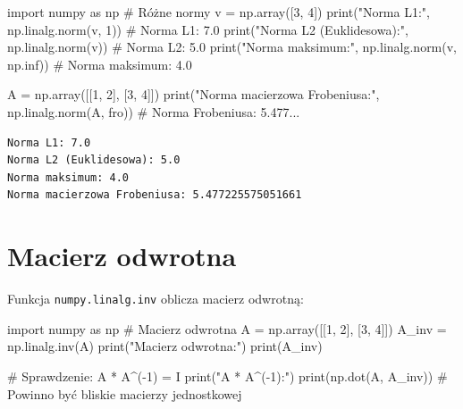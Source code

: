 \documentclass[
  polish,
  letterpaper,
  DIV=11,
  numbers=noendperiod]{scrreprt}
\newenvironment{Shaded}{\begin{snugshade}}{\end{snugshade}}
\newcommand{\BuiltInTok}[1]{\textcolor[rgb]{0.00,0.23,0.31}{#1}}
\newcommand{\CommentTok}[1]{\textcolor[rgb]{0.37,0.37,0.37}{#1}}
\newcommand{\DecValTok}[1]{\textcolor[rgb]{0.68,0.00,0.00}{#1}}
\newcommand{\ImportTok}[1]{\textcolor[rgb]{0.00,0.46,0.62}{#1}}
\newcommand{\NormalTok}[1]{\textcolor[rgb]{0.00,0.23,0.31}{#1}}
\newcommand{\OperatorTok}[1]{\textcolor[rgb]{0.37,0.37,0.37}{#1}}
\newcommand{\StringTok}[1]{\textcolor[rgb]{0.13,0.47,0.30}{#1}}
\begin{document}
\begin{Shaded}
\begin{Highlighting}[]
\ImportTok{import}\NormalTok{ numpy }\ImportTok{as}\NormalTok{ np}
\CommentTok{\# Różne normy}
\NormalTok{v }\OperatorTok{=}\NormalTok{ np.array([}\DecValTok{3}\NormalTok{, }\DecValTok{4}\NormalTok{])}
\BuiltInTok{print}\NormalTok{(}\StringTok{"Norma L1:"}\NormalTok{, np.linalg.norm(v, }\DecValTok{1}\NormalTok{))  }\CommentTok{\# Norma L1: 7.0}
\BuiltInTok{print}\NormalTok{(}\StringTok{"Norma L2 (Euklidesowa):"}\NormalTok{, np.linalg.norm(v))  }\CommentTok{\# Norma L2: 5.0}
\BuiltInTok{print}\NormalTok{(}\StringTok{"Norma maksimum:"}\NormalTok{, np.linalg.norm(v, np.inf))  }\CommentTok{\# Norma maksimum: 4.0}

\NormalTok{A }\OperatorTok{=}\NormalTok{ np.array([[}\DecValTok{1}\NormalTok{, }\DecValTok{2}\NormalTok{], [}\DecValTok{3}\NormalTok{, }\DecValTok{4}\NormalTok{]])}
\BuiltInTok{print}\NormalTok{(}\StringTok{"Norma macierzowa Frobeniusa:"}\NormalTok{, np.linalg.norm(A, }\StringTok{\textquotesingle{}fro\textquotesingle{}}\NormalTok{))  }\CommentTok{\# Norma Frobeniusa: 5.477...}
\end{Highlighting}
\end{Shaded}

\begin{verbatim}
Norma L1: 7.0
Norma L2 (Euklidesowa): 5.0
Norma maksimum: 4.0
Norma macierzowa Frobeniusa: 5.477225575051661
\end{verbatim}

\section{Macierz odwrotna}\label{macierz-odwrotna}

Funkcja \texttt{numpy.linalg.inv} oblicza macierz odwrotną:

\begin{Shaded}
\begin{Highlighting}[]
\ImportTok{import}\NormalTok{ numpy }\ImportTok{as}\NormalTok{ np}
\CommentTok{\# Macierz odwrotna}
\NormalTok{A }\OperatorTok{=}\NormalTok{ np.array([[}\DecValTok{1}\NormalTok{, }\DecValTok{2}\NormalTok{], [}\DecValTok{3}\NormalTok{, }\DecValTok{4}\NormalTok{]])}
\NormalTok{A\_inv }\OperatorTok{=}\NormalTok{ np.linalg.inv(A)}
\BuiltInTok{print}\NormalTok{(}\StringTok{"Macierz odwrotna:"}\NormalTok{)}
\BuiltInTok{print}\NormalTok{(A\_inv)}

\CommentTok{\# Sprawdzenie: A * A\^{}({-}1) = I}
\BuiltInTok{print}\NormalTok{(}\StringTok{"A * A\^{}({-}1):"}\NormalTok{)}
\BuiltInTok{print}\NormalTok{(np.dot(A, A\_inv))  }\CommentTok{\# Powinno być bliskie macierzy jednostkowej}
\end{Highlighting}
\end{Shaded}
\end{document}
